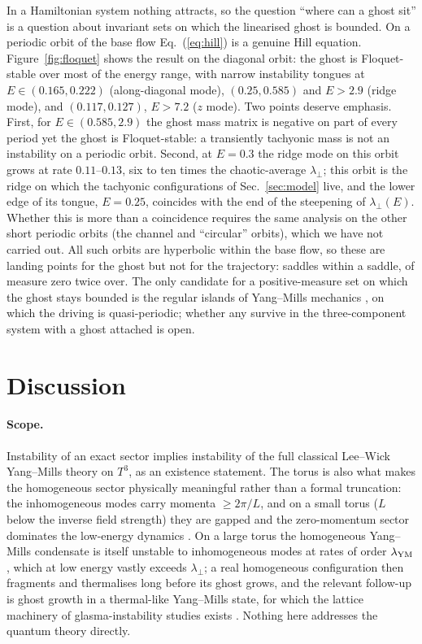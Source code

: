 \documentclass[11pt,a4paper]{article}
\newcommand{\YM}{{\rm YM}}
\begin{document}
In a Hamiltonian system nothing attracts, so the question ``where can a ghost sit'' is a question
about invariant sets on which the linearised ghost is bounded. On a periodic orbit of the base
flow Eq.~(\ref{eq:hill}) is a genuine Hill equation. Figure~\ref{fig:floquet} shows the result on
the diagonal orbit: the ghost is Floquet-stable over most of the energy range, with narrow
instability tongues at $E\in(0.165,0.222)$ (along-diagonal mode), $(0.25,0.585)$ and $E>2.9$
(ridge mode), and $(0.117,0.127)$, $E>7.2$ ($z$ mode). Two points deserve emphasis. First, for
$E\in(0.585,2.9)$ the ghost mass matrix is negative on part of every period yet the ghost is
Floquet-stable: a transiently tachyonic mass is not an instability on a periodic orbit. Second,
at $E=0.3$ the ridge mode on this orbit grows at rate $0.11$--$0.13$, six to ten times the
chaotic-average $\lambda_\perp$; this orbit is the ridge on which the tachyonic configurations of
Sec.~\ref{sec:model} live, and the lower edge of its tongue, $E=0.25$, coincides with the end of
the steepening of $\lambda_\perp(E)$. Whether this is more than a coincidence requires the same
analysis on the other short periodic orbits (the channel and ``circular'' orbits), which we have
not carried out. All such
orbits are hyperbolic within the base flow, so these are landing points for the ghost but not
for the trajectory: saddles within a saddle, of measure zero twice over. The only candidate for a
positive-measure set on which the ghost stays bounded is the regular islands of Yang--Mills
mechanics \cite{DahlqvistRussberg}, on which the driving is quasi-periodic; whether any survive in
the three-component system with a ghost attached is open.

\section{Discussion}
\label{sec:discussion}

\paragraph{Scope.} Instability of an exact sector implies instability of the full classical
Lee--Wick Yang--Mills theory on $T^3$, as an existence statement. The torus is also what makes
the homogeneous sector physically meaningful rather than a formal truncation: the inhomogeneous
modes carry momenta $\ge2\pi/L$, and on a small torus ($L$ below the inverse field strength)
they are gapped and the zero-momentum sector dominates the low-energy dynamics
\cite{Luscher83}. On a large torus the homogeneous Yang--Mills condensate is itself unstable to
inhomogeneous modes at rates of order $\lambda_\YM$, which at low energy vastly exceeds
$\lambda_\perp$; a real homogeneous configuration then fragments and thermalises long before its
ghost grows, and the relevant follow-up is ghost growth in a thermal-like
Yang--Mills state, for which the lattice machinery of glasma-instability studies exists
\cite{MullerTrayanov,Kunihiro}. Nothing here addresses the quantum theory directly.
\end{document}
